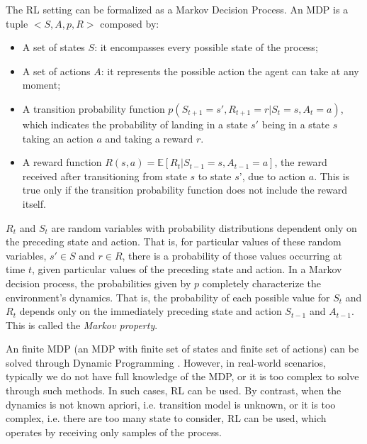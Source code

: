 The RL setting can be formalized as a Markov Decision Process. An MDP is a tuple $<S,A,p,R>$ composed by:
\begin{itemize}
  \item A set of states \(S\): it encompasses every possible state of the process;
  \item A set of actions \(A\): it represents the possible action the agent can take at any moment;
 \item A transition probability function \(p(S_{t+1} = s',R_{t+1} = r|S_t=s, A_t=a) \), which indicates the probability of landing in a state \(s'\) being in a state \(s\) taking an action \(a\) and taking a reward $r$.
 \item A reward function \(R(s, a) = \mathbb{E}[R_t|S_{t-1}=s, A_{t-1}=a]\), the reward received after transitioning from state $s$ to state $s$', due to action $a$. This is true only if the transition probability function does not include the reward itself.

\end{itemize}
$R_t$ and $S_t$ are random variables with probability distributions dependent only on the preceding state and action. That is, for particular values of these random variables, $s' \in S$ and $r \in  R$, there is a probability of those values occurring at time $t$, given particular values of the preceding state and action. 
In a Markov decision process, the probabilities given by $p$ completely characterize the
environment’s dynamics. That is, the probability of each possible value for $S_t$ and $R_t$
depends only on the immediately preceding state and action $S_{t-1}$ and $A_{t-1}$. This is called the \textit{Markov property}.

An finite MDP (an MDP with finite set of states and finite set of actions) can be solved through Dynamic Programming \cite{irl}. However, in real-world scenarios, typically we do not have full knowledge of the MDP, or it is too complex to solve through such methods. In such cases, RL can be used. By contrast, when the dynamics is not known apriori, i.e.  transition model is unknown, or it is too complex, i.e. there are too many state to consider, RL can be used, which operates by receiving only samples of the process. 

